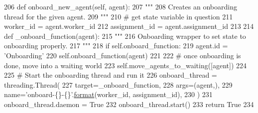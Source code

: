 \begin{DoxyCode}
206     \textcolor{keyword}{def }onboard\_new\_agent(self, agent):
207         \textcolor{stringliteral}{"""}
208 \textcolor{stringliteral}{        Creates an onboarding thread for the given agent.}
209 \textcolor{stringliteral}{        """}
210         \textcolor{comment}{# get state variable in question}
211         worker\_id = agent.worker\_id
212         assignment\_id = agent.assignment\_id
213 
214         \textcolor{keyword}{def }\_onboard\_function(agent):
215             \textcolor{stringliteral}{"""}
216 \textcolor{stringliteral}{            Onboarding wrapper to set state to onboarding properly.}
217 \textcolor{stringliteral}{            """}
218             \textcolor{keywordflow}{if} self.onboard\_function:
219                 agent.id = \textcolor{stringliteral}{'Onboarding'}
220                 self.onboard\_function(agent)
221 
222             \textcolor{comment}{# once onboarding is done, move into a waiting world}
223             self.move\_agents\_to\_waiting([agent])
224 
225         \textcolor{comment}{# Start the onboarding thread and run it}
226         onboard\_thread = threading.Thread(
227             target=\_onboard\_function,
228             args=(agent,),
229             name=\textcolor{stringliteral}{'onboard-\{\}-\{\}'}.\hyperlink{namespaceparlai_1_1chat__service_1_1services_1_1messenger_1_1shared__utils_a32e2e2022b824fbaf80c747160b52a76}{format}(worker\_id, assignment\_id),
230         )
231         onboard\_thread.daemon = \textcolor{keyword}{True}
232         onboard\_thread.start()
233         \textcolor{keywordflow}{return} \textcolor{keyword}{True}
234 
\end{DoxyCode}
\mbox{\label{classparlai_1_1mturk_1_1webapp_1_1run__mocks_1_1mock__turk__manager_1_1MockTurkManager_a01684c9ee2f88571eb873d5cc6061c21}} 
